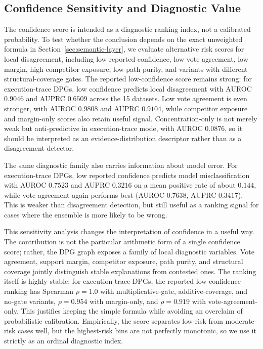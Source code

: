 \documentclass[runningheads]{llncs}
\begin{document}
\subsection{Confidence Sensitivity and Diagnostic Value}

The confidence score is intended as a diagnostic ranking index, not a calibrated probability. To test whether the conclusion depends on the exact unweighted formula in Section~\ref{sec:semantic-layer}, we evaluate alternative risk scores for local disagreement, including low reported confidence, low vote agreement, low margin, high competitor exposure, low path purity, and variants with different structural-coverage gates. The reported low-confidence score remains strong: for execution-trace DPGs, low confidence predicts local disagreement with AUROC $0.9046$ and AUPRC $0.6509$ across the 15 datasets. Low vote agreement is even stronger, with AUROC $0.9808$ and AUPRC $0.9104$, while competitor exposure and margin-only scores also retain useful signal. Concentration-only is not merely weak but anti-predictive in execution-trace mode, with AUROC $0.0876$, so it should be interpreted as an evidence-distribution descriptor rather than as a disagreement detector.

The same diagnostic family also carries information about model error. For execution-trace DPGs, low reported confidence predicts model misclassification with AUROC $0.7523$ and AUPRC $0.3216$ on a mean positive rate of about $0.144$, while vote agreement again performs best (AUROC $0.7638$, AUPRC $0.3417$). This is weaker than disagreement detection, but still useful as a ranking signal for cases where the ensemble is more likely to be wrong.

This sensitivity analysis changes the interpretation of confidence in a useful way. The contribution is not the particular arithmetic form of a single confidence score; rather, the DPG graph exposes a family of local diagnostic variables. Vote agreement, support margin, competitor exposure, path purity, and structural coverage jointly distinguish stable explanations from contested ones. The ranking itself is highly stable: for execution-trace DPGs, the reported low-confidence ranking has Spearman $\rho=1.0$ with multiplicative-gate, additive-coverage, and no-gate variants, $\rho=0.954$ with margin-only, and $\rho=0.919$ with vote-agreement-only. This justifies keeping the simple formula while avoiding an overclaim of probabilistic calibration. Empirically, the score separates low-risk from moderate-risk cases well, but the highest-risk bins are not perfectly monotonic, so we use it strictly as an ordinal diagnostic index.
\end{document}
